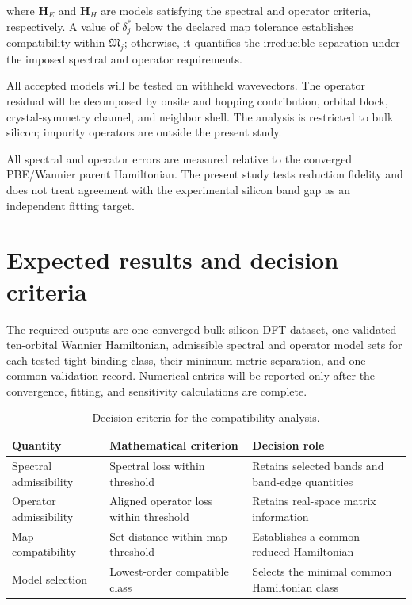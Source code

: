 \documentclass[preprint,12pt]{elsarticle}
\begin{document}
where $\bm{H}_{E}$ and $\bm{H}_{H}$ are models satisfying the spectral and
operator criteria, respectively. A value of $\delta_{j}^{\ast}$ below the
declared map tolerance establishes compatibility within $\mathfrak{M}_{j}$;
otherwise, it quantifies the irreducible separation under the imposed spectral
and operator requirements.

All accepted models will be tested on withheld wavevectors. The operator
residual will be decomposed by onsite and hopping contribution, orbital block,
crystal-symmetry channel, and neighbor shell. The analysis is restricted to
bulk silicon; impurity operators are outside the present study.

All spectral and operator errors are measured relative to the converged
PBE/Wannier parent Hamiltonian. The present study tests reduction fidelity and
does not treat agreement with the experimental silicon band gap as an
independent fitting target.

\section{Expected results and decision criteria}
\label{sec:expected-results}

The required outputs are one converged bulk-silicon DFT dataset, one validated
ten-orbital Wannier Hamiltonian, admissible spectral and operator model sets for
each tested tight-binding class, their minimum metric separation, and one
common validation record. Numerical entries will be reported only after the
convergence, fitting, and sensitivity calculations are complete.

\begin{table}[t]
\centering
\caption{Decision criteria for the compatibility analysis.}
\label{tab:decision-criteria}
\begin{tabular}{@{}
>{\raggedright\arraybackslash}p{}
>{\raggedright\arraybackslash}p{}
>{\raggedright\arraybackslash}p{}@{}}
\toprule
Quantity & Mathematical criterion & Decision role \\
\midrule
Spectral admissibility
& Spectral loss within threshold
& Retains selected bands and band-edge quantities \\
Operator admissibility
& Aligned operator loss within threshold
& Retains real-space matrix information \\
Map compatibility
& Set distance within map threshold
& Establishes a common reduced Hamiltonian \\
Model selection
& Lowest-order compatible class
& Selects the minimal common Hamiltonian class \\
\bottomrule
\end{tabular}
\end{table}
\end{document}
